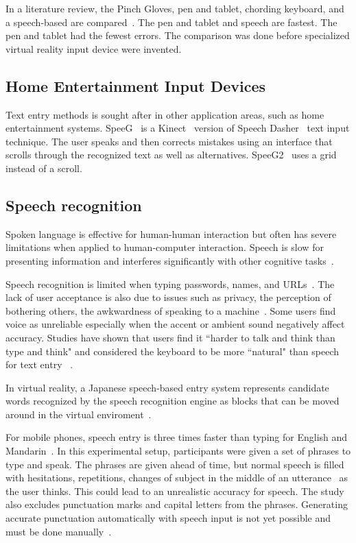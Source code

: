In a literature review, the Pinch Gloves, pen and tablet, chording keyboard, and a speech-based are compared~\cite{bowman2002text}.
The pen and tablet and speech are fastest.  The pen and tablet had the fewest errors.
The comparison was done before specialized virtual reality input device were invented.

\subsection{Home Entertainment Input Devices}
Text entry methods is sought after in other application areas, such as home entertainment systems.
SpeeG~\cite{hoste2012speeg} is a Kinect~\cite{geerse2015kinematic} version of Speech Dasher~\cite{vertanen2010speech} text input technique.
The user speaks and then corrects mistakes using an interface that scrolls through the recognized text as well as alternatives.
SpeeG2~\cite{hoste2013speeg2} uses a grid instead of a scroll.

\subsection{Speech recognition}
Spoken language is effective for human-human interaction but often has severe limitations when applied to human-computer interaction.
Speech is slow for presenting information and interferes significantly with other cognitive tasks~\cite{shneiderman2000limits}.

Speech recognition is limited when typing passwords, names, and URLs~\cite{TODO}. 
The lack of user acceptance is also due to issues such as privacy, the perception of bothering others, the awkwardness of speaking to a machine~\cite{sawhney2000nomadic}.
Some users find voice as unreliable especially when the accent or ambient sound negatively affect accuracy.
Studies have shown that users find it ``harder to talk and think than type and think" and considered the keyboard to be more ``natural" than speech for text entry ~\cite{Karat:1999:PEC:302979.303160}.

In virtual reality, a Japanese speech-based entry system represents candidate words recognized by the speech recognition engine as blocks that can be moved around in the virtual enviroment~\cite{osawa2002multimodal}. 

For mobile phones, speech entry is three times faster than typing for English and Mandarin~\cite{ruan2016speech}.  
In this experimental setup, participants were given a set of phrases to type and speak.
The phrases are given ahead of time, but normal speech is filled with hesitations, repetitions, changes of subject in the middle of an utterance~\cite{forsberg2003speech} as the user thinks.
This could lead to an unrealistic accuracy for speech.  
The study also excludes punctuation marks and capital letters from the phrases.
Generating accurate punctuation  automatically with speech input is not yet possible and must be done manually~\cite{chen1999speech}.

